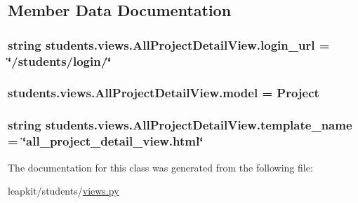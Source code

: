 \subsection{Member Data Documentation}
\hypertarget{classstudents_1_1views_1_1_all_project_detail_view_a58608f95af2ecd53269734a03d805f3f}{
\subsubsection[{login\-\_\-url}]{\setlength{\rightskip}{0pt plus 5cm}string students.\-views.\-All\-Project\-Detail\-View.\-login\-\_\-url = \char`\"{}/students/login/\char`\"{}\hspace{0.3cm}{\ttfamily [static]}}}\label{classstudents_1_1views_1_1_all_project_detail_view_a58608f95af2ecd53269734a03d805f3f}
\hypertarget{classstudents_1_1views_1_1_all_project_detail_view_a4cfc7df6cba375623235cb90098767d9}{
\subsubsection[{model}]{\setlength{\rightskip}{0pt plus 5cm}students.\-views.\-All\-Project\-Detail\-View.\-model = Project\hspace{0.3cm}{\ttfamily [static]}}}\label{classstudents_1_1views_1_1_all_project_detail_view_a4cfc7df6cba375623235cb90098767d9}
\hypertarget{classstudents_1_1views_1_1_all_project_detail_view_a6455b90d3855458abb8d369c26322c29}{
\subsubsection[{template\-\_\-name}]{\setlength{\rightskip}{0pt plus 5cm}string students.\-views.\-All\-Project\-Detail\-View.\-template\-\_\-name = \char`\"{}all\-\_\-project\-\_\-detail\-\_\-view.\-html\char`\"{}\hspace{0.3cm}{\ttfamily [static]}}}\label{classstudents_1_1views_1_1_all_project_detail_view_a6455b90d3855458abb8d369c26322c29}


The documentation for this class was generated from the following file\-:\begin{DoxyCompactItemize}
\item 
leapkit/students/\hyperlink{views_8py}{views.\-py}\end{DoxyCompactItemize}
